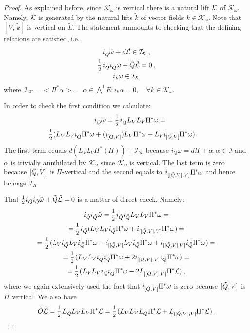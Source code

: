 \documentclass[a4paper,12pt]{article}
\numberwithin{equation}{section} %
\renewcommand{\tilde}{\widetilde}
\newcommand{\commut}[2]{[#1{,}\,#2]}
\newcommand{\half}{\mathchoice{%
    \ffrac{1}{2}}{\frac{1}{2}}{\frac{1}{2}}{\frac{1}{2}}}
\newcommand{\ffrac}[2]{\raisebox{.5pt}%
  {\footnotesize$\displaystyle\frac{#1}{#2}$}\kern1pt}
\def\cI{\mathcal{I}}
\def\cK{\mathcal{K}}
\def\cL{\mathcal{L}}
\begin{document}
\begin{proof} 
As explained before, since $\cK_{\omega}$ is vertical there is a natural lift $\Tilde{\cK}$ of $\cK_\omega$. Namely, $\Tilde{\cK}$ is generated by the natural lifts $\tilde k$ of  vector fields $k \in \cK_\omega$. Note that $\commut{V}{\tilde k}$ is vertical on $\tilde E$.  The statement ammounts to checking that the defining relations are satisfied, i.e. 
\begin{equation}
    \begin{gathered}
        i_{\Tilde{Q}}\Tilde{\omega} + d\Tilde{\cL} \in \cI_{\cK}\,, \\
        \half i_{\Tilde{Q}}i_{\Tilde{Q}}\Tilde{\omega} + \Tilde{Q}\Tilde{\cL} = 0 \,,
        \\
        i_{\Tilde{k}}\Tilde{\omega} \in \cI_{\cK}
\end{gathered}
\end{equation}
where $\cI_{\cK} = <\Pi^*\alpha>, \quad \alpha\in \bigwedge^1E: i_k\alpha = 0, \quad \forall k\in \cK_\omega $.

In order to check the first condition we calculate:
\begin{multline}
   \quad i_{\Tilde{Q}}\Tilde{\omega} = 
    \half i_{\Tilde{Q}}L_VL_V \Pi^* \omega = \\ \half(L_V L_V i_{\Tilde{Q}} \Pi^*\omega +(i_{[\Tilde{Q},V]})L_V \Pi^*\omega +  L_V i_{[\Tilde{Q},V]}\Pi^*\omega) \,.\quad 
\end{multline}
The first term equals $d(L_VL_V\Pi^*(H)) + \cI_{\cK}$ because $i_Q \omega = dH + \alpha, \alpha \in \cI$ and $\alpha$ is trivially annihilated by $\cK_\omega$ since $\cK_\omega$ is vertical.  
The last term is zero because $[\Tilde{Q},V]$ is $\Pi$-vertical and the second equals to $i_{[[\Tilde{Q},V],V]}\Pi^*\omega$ and hence belongs  $\cI_K$. 

That $\half i_{\Tilde{Q}}i_{\Tilde{Q}}\Tilde{\omega} + \Tilde{Q}\Tilde{\cL} = 0$ is a matter of direct check. Namely:
\begin{multline}
    i_{\Tilde{Q}}i_{\Tilde{Q}}\Tilde{\omega}  = \half i_{\Tilde{Q}}i_{\Tilde{Q}}L_V L_V \Pi^*\omega = \\= \half i_{\Tilde{Q}}( L_V L_V i_{\Tilde{Q}} \Pi^*\omega + i_{[[\Tilde{Q},V],V]}\Pi^*\omega) = \\ =  \half (L_V i_{\Tilde{Q}} L_V i_{\Tilde{Q}} \Pi^*\omega -i_{[[\Tilde{Q},V]} L_V i_{\Tilde{Q}} \Pi^*\omega + i_{[[\Tilde{Q},V],V]} i_{\Tilde{Q}}\Pi^*\omega ) = \\ = \half(L_V L_V i_{\Tilde{Q}}i_{\Tilde{Q}} \Pi^*\omega  + 2i_{[[\Tilde{Q},V],V]} i_{\Tilde{Q}}\Pi^*\omega )  = \\ = \half (L_V L_V i_{\Tilde{Q}}i_{\Tilde{Q}} \Pi^*\omega  - 2L_{[[\Tilde{Q},V],V]}\Pi^*\cL) \,,
\end{multline}
where we again extensively used the fact that  $i_{[\Tilde{Q},V]}\Pi^*\omega$ is zero because $[\Tilde{Q},V]$ is $\Pi$ vertical. We also have 
\begin{equation}
    \tilde{Q}\tilde{\cL} = \half L_{\Tilde{Q}}L_V L_V \Pi^*\cL = \half (L_V L_V L_{\Tilde{Q}}\Pi^*\cL + L_{[[\Tilde{Q},V],V]}\Pi^*\cL) \,.
\end{equation}


\end{proof}
\end{document}
